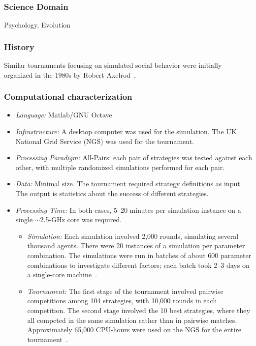 \documentclass[10pt,letterpaper]{article}
\begin{document}
\subsubsection{Science Domain} Psychology, Evolution

\subsubsection{History}
Similar tournaments focusing on simulated social
behavior were initially organized in the 1980s by Robert Axelrod~\cite{rendell-sociallearning-10}.

\subsubsection{Computational characterization}


\begin {itemize}
\item {\em Language:} Matlab/GNU Octave
\item {\em Infrastructure:}  A desktop computer was used for the simulation.  The UK National Grid Service (NGS) was used for the tournament.
\item {\em Processing Paradigm:} All-Pairs: each pair of strategies was tested
    against each other, with multiple randomized simulations performed for
    each pair.
\item {\em Data:} Minimal size.  The tournament required strategy definitions
            as input.  The output is statistics about the success
            of different strategies.
\item {\em Processing Time:} In both cases, 5--20 minutes per simulation
            instance on a single $\sim$2.5-GHz core was required.
    \begin{itemize}
        \item {\em Simulation:}  Each simulation involved 2,000 rounds,
        simulating several thousand agents.  There were 20 instances
        of a simulation per parameter combination.  The simulations were
        run in batches of about 600 parameter combinations to investigate
        different factors; each batch took 2--3 days on a single-core machine~\cite{rendell-email-10}.
        \item {\em Tournament:}
        The first stage of the tournament involved pairwise competitions among
        104 strategies, with 10,000 rounds in each competition.
        The second stage involved the 10 best strategies,
        where they all competed in the same simulation rather than in pairwise
        matches.  Approximately 65,000 CPU-hours were used on
        the NGS for the entire tournament~\cite{rendell-email-10}.
    \end{itemize}
\end {itemize}
\end{document}
